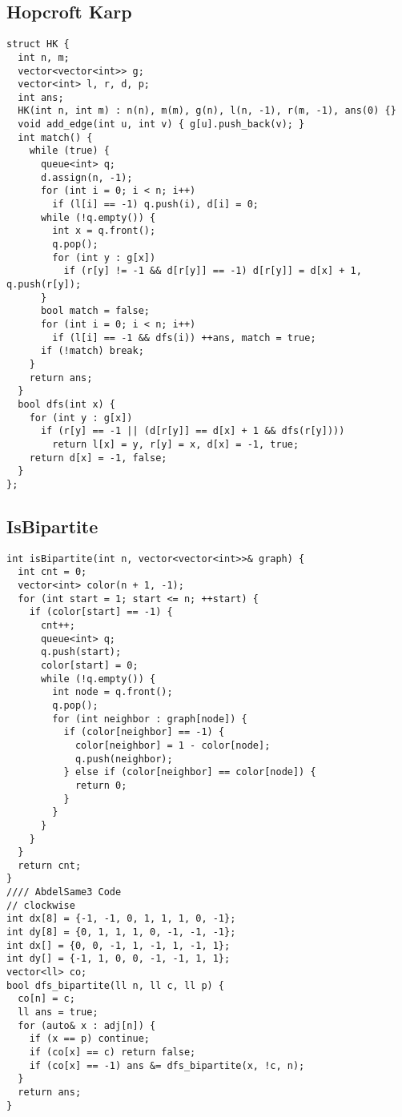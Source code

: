 \documentclass[twoside]{article}
\begin{document}
\begin{multicols*}{2}
{
\subsection*{Hopcroft Karp}
}
\begin{verbatim}
struct HK {
  int n, m;
  vector<vector<int>> g;
  vector<int> l, r, d, p;
  int ans;
  HK(int n, int m) : n(n), m(m), g(n), l(n, -1), r(m, -1), ans(0) {}
  void add_edge(int u, int v) { g[u].push_back(v); }
  int match() {
    while (true) {
      queue<int> q;
      d.assign(n, -1);
      for (int i = 0; i < n; i++)
        if (l[i] == -1) q.push(i), d[i] = 0;
      while (!q.empty()) {
        int x = q.front();
        q.pop();
        for (int y : g[x])
          if (r[y] != -1 && d[r[y]] == -1) d[r[y]] = d[x] + 1, q.push(r[y]);
      }
      bool match = false;
      for (int i = 0; i < n; i++)
        if (l[i] == -1 && dfs(i)) ++ans, match = true;
      if (!match) break;
    }
    return ans;
  }
  bool dfs(int x) {
    for (int y : g[x])
      if (r[y] == -1 || (d[r[y]] == d[x] + 1 && dfs(r[y])))
        return l[x] = y, r[y] = x, d[x] = -1, true;
    return d[x] = -1, false;
  }
};
\end{verbatim}

{
\subsection*{IsBipartite}
}
\begin{verbatim}
int isBipartite(int n, vector<vector<int>>& graph) {
  int cnt = 0;
  vector<int> color(n + 1, -1);
  for (int start = 1; start <= n; ++start) {
    if (color[start] == -1) {
      cnt++;
      queue<int> q;
      q.push(start);
      color[start] = 0;
      while (!q.empty()) {
        int node = q.front();
        q.pop();
        for (int neighbor : graph[node]) {
          if (color[neighbor] == -1) {
            color[neighbor] = 1 - color[node];
            q.push(neighbor);
          } else if (color[neighbor] == color[node]) {
            return 0;
          }
        }
      }
    }
  }
  return cnt;
}
//// AbdelSame3 Code
// clockwise
int dx[8] = {-1, -1, 0, 1, 1, 1, 0, -1};
int dy[8] = {0, 1, 1, 1, 0, -1, -1, -1};
int dx[] = {0, 0, -1, 1, -1, 1, -1, 1};
int dy[] = {-1, 1, 0, 0, -1, -1, 1, 1};
vector<ll> co;
bool dfs_bipartite(ll n, ll c, ll p) {
  co[n] = c;
  ll ans = true;
  for (auto& x : adj[n]) {
    if (x == p) continue;
    if (co[x] == c) return false;
    if (co[x] == -1) ans &= dfs_bipartite(x, !c, n);
  }
  return ans;
}
\end{verbatim}


\end{multicols*}
\end{document}

